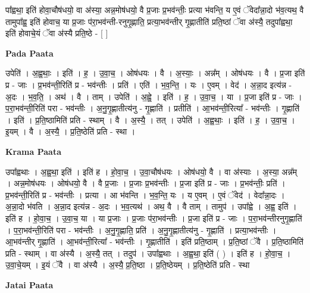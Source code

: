 \documentclass[17pt]{extarticle}
\begin{document}
पा᳚ह्वथा॒ इति॑ होवा॒चौष॑धयो॒ वा अ॑स्या॒ अन्न॒मोष॑धयो॒ वै प्र॒जाः प्र॒भव॑न्तीः॒ प्रत्या भ॑वन्ति॒ य ए॒वं ॅवेदा᳚न्ना॒दो भ॑व॒त्यथ॒ वै तामुपा᳚ह्व॒ इति॑ होवाच॒ या प्र॒जाः प॑रा॒भव॑न्ती-रनुगृ॒ह्णाति॒ प्रत्या॒भव॑न्तीर् गृ॒ह्णातीति॑ प्रति॒ष्ठां ॅवा अ॑स्यै॒ तदुपा᳚ह्वथा॒ इति॑ होवाचे॒यं ॅवा अ॑स्यै प्रति॒ष्ठे - [ ] \newline

\textbf{Pada Paata} \newline

उपेति॑ । अ॒ह्व॒थाः॒ । इति॑ । ह॒ । उ॒वा॒च॒ । ओष॑धयः । वै । अ॒स्याः॒ । अन्न᳚म् । ओष॑धयः । वै । प्र॒जा इति॑ प्र - जाः । प्र॒भव॑न्ती॒रिति॑ प्र - भव॑न्तीः । प्रति॑ । एति॑ । भ॒व॒न्ति॒ । यः । ए॒वम् । वेद॑ । अ॒न्ना॒द इत्य॑न्न - अ॒दः । भ॒व॒ति॒ । अथ॑ । वै । ताम् । उपेति॑ । अ॒ह्वे॒ । इति॑ । ह॒ । उ॒वा॒च॒ । या । प्र॒जा इति॑ प्र - जाः । प॒रा॒भव॑न्ती॒रिति॑ परा - भव॑न्तीः । अ॒नु॒गृ॒ह्णातीत्य॑नु - गृ॒ह्णाति॑ । प्रतीति॑ । आ॒भव॑न्ती॒रित्या᳚ - भव॑न्तीः । गृ॒ह्णाति॑ । इति॑ । प्र॒ति॒ष्ठामिति॑ प्रति - स्थाम् । वै । अ॒स्यै॒ । तत् । उपेति॑ । अ॒ह्व॒थाः॒ । इति॑ । ह॒ । उ॒वा॒च॒ । इ॒यम् । वै । अ॒स्यै॒ । प्र॒ति॒ष्ठेति॑ प्रति - स्था ।  \newline


\textbf{Krama Paata} \newline

उपा᳚ह्वथाः । अ॒ह्व॒था॒ इति॑ । इति॑ ह । हो॒वा॒च॒ । उ॒वा॒चौष॑धयः । ओष॑धयो॒ वै । वा अ॑स्याः । अ॒स्या॒ अन्न᳚म् । अन्न॒मोष॑धयः । ओष॑धयो॒ वै । वै प्र॒जाः । प्र॒जाः प्र॒भव॑न्तीः । प्र॒जा इति॑ प्र - जाः । प्र॒भव॑न्तीः॒ प्रति॑ । प्र॒भव॑न्ती॒रिति॑ प्र - भव॑न्तीः । प्रत्या । आ भ॑वन्ति । भ॒व॒न्ति॒ यः । य ए॒वम् । ए॒वं ॅवेद॑ । वेदा᳚न्ना॒दः । अ॒न्ना॒दो भ॑वति । अ॒न्ना॒द इत्य॑न्न - अ॒दः । भ॒व॒त्यथ॑ । अथ॒ वै । वै ताम् । तामुप॑ । उपा᳚ह्वे । अ॒ह्व॒ इति॑ । इति॑ ह । हो॒वा॒च॒ । उ॒वा॒च॒ या । या प्र॒जाः । प्र॒जाः प॑रा॒भव॑न्तीः । प्र॒जा इति॑ प्र - जाः । प॒रा॒भव॑न्तीरनुगृ॒ह्णाति॑ । प॒रा॒भव॑न्ती॒रिति॑ परा - भव॑न्तीः । अ॒नु॒गृ॒ह्णाति॒ प्रति॑ । अ॒नु॒गृ॒ह्णातीत्य॑नु - गृ॒ह्णाति॑ । प्रत्या॒भव॑न्तीः । आ॒भव॑न्तीर् गृ॒ह्णाति॑ । आ॒भव॑न्ती॒रित्या᳚ - भव॑न्तीः । गृ॒ह्णातीति॑ । इति॑ प्रति॒ष्ठाम् । प्र॒ति॒ष्ठां ॅवै । प्र॒ति॒ष्ठामिति॑ प्रति - स्थाम् । वा अ॑स्यै । अ॒स्यै॒ तत् । तदुप॑ । उपा᳚ह्वथाः । 
अ॒ह्व॒था॒ इति॑ ( ) । इति॑ ह । हो॒वा॒च॒ । उ॒वा॒चे॒यम् । इ॒यं ॅवै । 
वा अ॑स्यै । अ॒स्यै॒ प्र॒ति॒ष्ठा । प्र॒ति॒ष्ठेयम् । 
प्र॒ति॒ष्ठेति॑ प्रति - स्था \newline

\textbf{Jatai Paata} \newline
\end{document}

